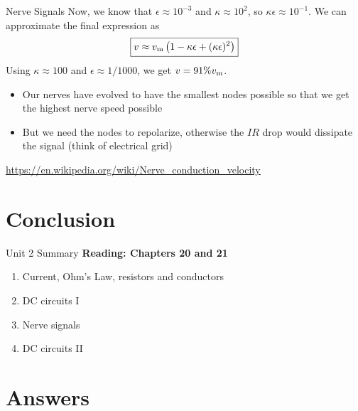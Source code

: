 \documentclass{beamer}
\begin{document}
\begin{frame}{Nerve Signals}
Now, we know that $\epsilon \approx 10^{-3}$ and $\kappa \approx 10^2$, so $\kappa\epsilon \approx 10^{-1}$.  We can approximate the final expression as
\begin{equation}
\boxed{
v \approx v_{\rm m} \left( 1-\kappa\epsilon + (\kappa\epsilon)^2 \right)
}
\end{equation}
Using $\kappa \approx 100$ and $\epsilon \approx 1/1000$, we get $v = 91\% v_{\rm m}$.
\begin{itemize}
\item Our nerves have evolved to have the smallest nodes possible so that we get the highest nerve speed possible
\item But we need the nodes to repolarize, otherwise the $IR$ drop would dissipate the signal (think of electrical grid)
\end{itemize}
\url{https://en.wikipedia.org/wiki/Nerve_conduction_velocity}
\end{frame}

\section{Conclusion}

\begin{frame}{Unit 2 Summary}
\textbf{Reading: Chapters 20 and 21}
\begin{enumerate}
\item Current, Ohm's Law, resistors and conductors
\item DC circuits I
\item Nerve signals
\item \alert{DC circuits II}
\end{enumerate}
\end{frame}

\section{Answers}
\end{document}
